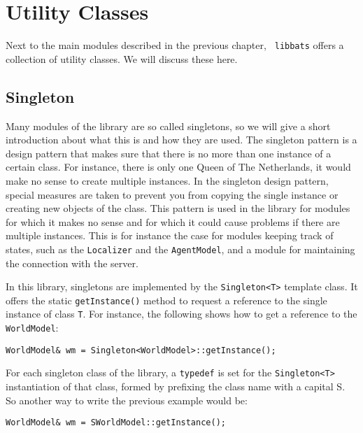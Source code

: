 \chapter{Utility Classes}

Next to the main modules described in the previous chapter, {\tt
  libbats} offers a collection of utility classes. We will discuss
these here.

\lstset{numbers=none}

\section{Singleton}
\label{secSingleton}

Many modules of the library are so called singletons, so we will give
a short introduction about what this is and how they are used. The
singleton pattern is a design pattern that makes sure that there is no
more than one instance of a certain class. For instance, there is only
one Queen of The Netherlands, it would make no sense to create
multiple instances. In the singleton design pattern, special measures
are taken to prevent you from copying the single instance or creating
new objects of the class. This pattern is used in the library for
modules for which it makes no sense and for which it could cause
problems if there are multiple instances. This is for instance the
case for modules keeping track of states, such as the {\tt Localizer}
and the {\tt AgentModel}, and a module for maintaining the connection
with the server.

In this library, singletons are implemented by the {\tt Singleton<T>}
template class. It offers the static {\tt getInstance()} method to
request a reference to the single instance of class {\tt T}. For
instance, the following shows how to get a reference to the {\tt
  WorldModel}:
\begin{lstlisting}[frame=single]
WorldModel& wm = Singleton<WorldModel>::getInstance();
\end{lstlisting}
For each singleton class of the library, a {\tt typedef} is set for
the {\tt Singleton<T>} instantiation of that class, formed by
prefixing the class name with a capital S. So another way to write the
previous example would be:
\begin{lstlisting}[frame=single]
WorldModel& wm = SWorldModel::getInstance();
\end{lstlisting}

